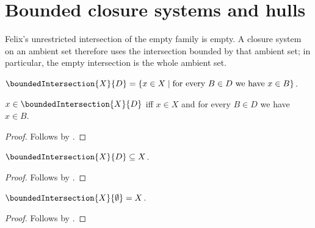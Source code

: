 


\section{Bounded closure systems and hulls}

Felix's unrestricted intersection of the empty family is empty.  A closure
system on an ambient set therefore uses the intersection bounded by that
ambient set; in particular, the empty intersection is the whole ambient set.

\begin{definition}\label{spike_bounded_intersection}
    $\boundedIntersection{X}{D}
        =\{x\in X\mid
            \text{for every $B\in D$ we have $x\in B$}\}$.
\end{definition}

\begin{proposition}\label{spike_bounded_intersection_iff}
    $x\in\boundedIntersection{X}{D}$ iff
        $x\in X$ and for every $B\in D$ we have $x\in B$.
\end{proposition}
\begin{proof}
    Follows by .
\end{proof}

\begin{proposition}\label{spike_bounded_intersection_subseteq}
    $\boundedIntersection{X}{D}\subseteq X$.
\end{proposition}
\begin{proof}
    Follows by .
\end{proof}

\begin{proposition}\label{spike_bounded_intersection_empty}
    $\boundedIntersection{X}{\emptyset}=X$.
\end{proposition}
\begin{proof}
    Follows by
        .
\end{proof}

